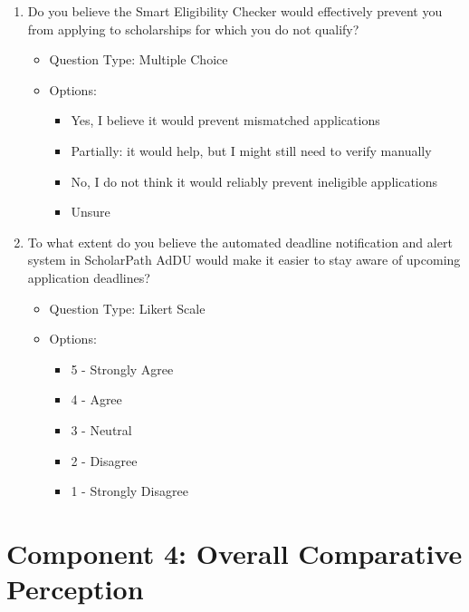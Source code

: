 \begin{enumerate}[resume=q, label={Question \arabic*:}, leftmargin=*, align=left]
  \item Do you believe the Smart Eligibility Checker would effectively prevent you from applying to scholarships for which you do not qualify?
  \begin{itemize}[leftmargin=*]
    \item Question Type: Multiple Choice
    \item Options:
    \begin{itemize}[leftmargin=*]
      \item Yes, I believe it would prevent mismatched applications
      \item Partially: it would help, but I might still need to verify manually
      \item No, I do not think it would reliably prevent ineligible applications
      \item Unsure
    \end{itemize}
  \end{itemize}
  \item To what extent do you believe the automated deadline notification and alert system in ScholarPath AdDU would make it easier to stay aware of upcoming application deadlines?
  \begin{itemize}[leftmargin=*]
    \item Question Type: Likert Scale
    \item Options:
    \begin{itemize}[leftmargin=*]
      \item 5 - Strongly Agree
      \item 4 - Agree
      \item 3 - Neutral
      \item 2 - Disagree
      \item 1 - Strongly Disagree
    \end{itemize}
  \end{itemize}
\end{enumerate}

\section{Component 4: Overall Comparative Perception}

